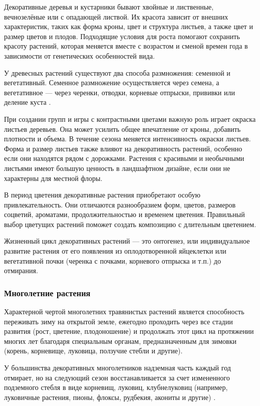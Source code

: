 Декоративные деревья и кустарники бывают хвойные и лиственные, вечнозелёные или с опадающей листвой. Их красота зависит от внешних характеристик, таких как форма кроны, цвет и структура листьев, а также цвет и размер цветов и плодов. Подходящие условия для роста помогают сохранить красоту растений, которая меняется вместе с возрастом и сменой времен года в зависимости от генетических особенностей вида.

У древесных растений существуют два способа размножения: семенной и вегетативный. Семенное размножение осуществляется через семена, а вегетативное — через черенки, отводки, корневые отпрыски, прививки или деление куста \cite{berd}.

При создании групп и игры с контрастными цветами важную роль играет окраска листьев деревьев. Она может усилить общее впечатление от кроны, добавить плотности и объема. В течение сезона меняется интенсивность окраски листьев. Форма и размер листьев также влияют на декоративность растений, особенно если они находятся рядом с дорожками. Растения с красивыми и необычными листьями имеют большую ценность в ландшафтном дизайне, если они не характерны для местной флоры.

В период цветения декоративные растения приобретают особую привлекательность. Они отличаются разнообразием форм, цветов, размеров соцветий, ароматами, продолжительностью и временем цветения. Правильный выбор цветущих растений поможет создать композицию с длительным цветением.

Жизненный цикл декоративных растений — это онтогенез, или индивидуальное развитие растения от его появления из оплодотворенной яйцеклетки или вегетативной почки (черенка с почками, корневого отпрыска и т.п.) до отмирания.

\subsubsection{Многолетние растения}

Характерной чертой многолетних травянистых растений является способность переживать зиму на открытой земле, ежегодно проходить через все стадии развития (рост, цветение, плодоношение) и продолжать этот цикл на протяжении многих лет благодаря специальным органам, предназначенным для зимовки (корень, корневище, луковица, ползучие стебли и другие).

У большинства декоративных многолетников надземная часть каждый год отмирает, но на следующий сезон восстанавливается за счет измененного подземного стебля в виде корневищ, луковиц, клубнелуковиц (например, луковичные растения, пионы, флоксы, рудбекия, акониты и другие) \cite{viyginaOpen}.

